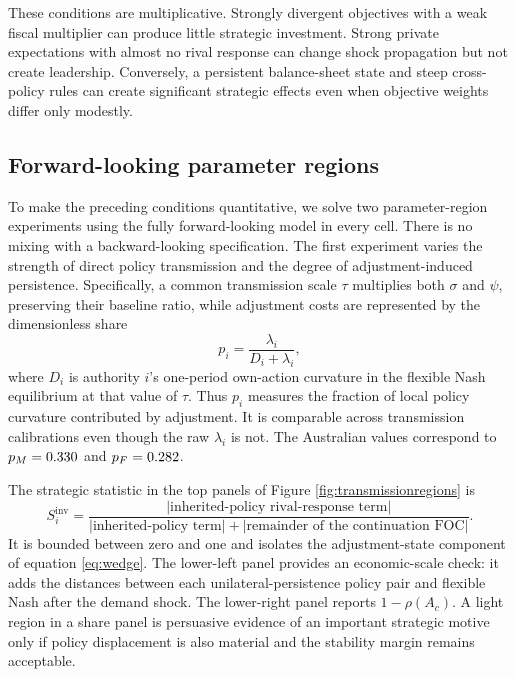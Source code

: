\documentclass[11pt]{article}
\begin{document}
These conditions are multiplicative. Strongly divergent objectives with a
weak fiscal multiplier can produce little strategic investment. Strong
private expectations with almost no rival response can change shock
propagation but not create leadership. Conversely, a persistent balance-sheet
state and steep cross-policy rules can create significant strategic effects
even when objective weights differ only modestly.

\subsection{Forward-looking parameter regions}
\label{sec:regions}

To make the preceding conditions quantitative, we solve two parameter-region
experiments using the fully forward-looking model in every cell. There is no
mixing with a backward-looking specification. The first experiment varies the
strength of direct policy transmission and the degree of adjustment-induced
persistence. Specifically, a common transmission scale $\tau$ multiplies both
$\sigma$ and $\psi$, preserving their baseline ratio, while adjustment costs
are represented by the dimensionless share
\begin{equation}
p_i=\frac{\lambda_i}{D_i+\lambda_i},                       \label{eq:pshare}
\end{equation}
where $D_i$ is authority $i$'s one-period own-action curvature in the flexible
Nash equilibrium at that value of $\tau$. Thus $p_i$ measures the fraction of
local policy curvature contributed by adjustment. It is comparable across
transmission calibrations even though the raw $\lambda_i$ is not. The
Australian values correspond to $p_M=0.330$ and
$p_F=0.282$.

The strategic statistic in the top panels of Figure
\ref{fig:transmissionregions} is
\begin{equation}
S_i^{\mathrm{inv}}=
\frac{|\text{inherited-policy rival-response term}|}
{|\text{inherited-policy term}|+
 |\text{remainder of the continuation FOC}|}.             \label{eq:invshare}
\end{equation}
It is bounded between zero and one and isolates the adjustment-state component
of equation \eqref{eq:wedge}. The lower-left panel provides an economic-scale
check: it adds the distances between each unilateral-persistence policy pair
and flexible Nash after the demand shock. The lower-right panel reports
$1-\rho(A_c)$. A light region in a share panel is persuasive evidence of an
important strategic motive only if policy displacement is also material and
the stability margin remains acceptable.
\end{document}
